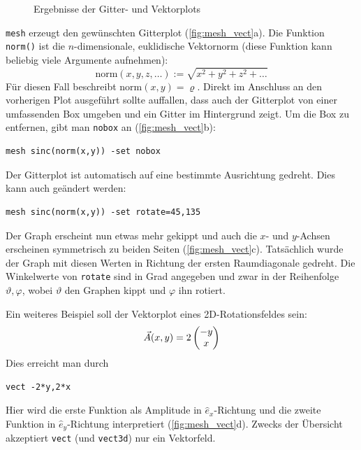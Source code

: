 \documentclass[DIV=14,headsepline,footsepline]{scrbook}
\begin{document}
\begin{figure}[p]
					\caption{Ergebnisse der Gitter- und Vektorplots}
					\label{fig:mesh_vect}
				\end{figure}
				\lstinline+mesh+ erzeugt den gewünschten Gitterplot (\autoref{fig:mesh_vect}a). Die Funktion \lstinline+norm()+ ist die $n$-di\-men\-sio\-na\-le, euklidische Vektornorm (diese Funktion kann beliebig viele Argumente aufnehmen):
				\begin{equation*}
					\text{norm}(x,y,z,\ldots) := \sqrt{x^2+y^2+z^2+\ldots}
				\end{equation*}
				Für diesen Fall beschreibt $\text{norm}(x,y) = \varrho$. Direkt im Anschluss an den vorherigen Plot ausgeführt sollte auffallen, dass auch der Gitterplot von einer umfassenden Box umgeben und ein Gitter im Hintergrund zeigt. Um die Box zu entfernen, gibt man \lstinline+nobox+ an (\autoref{fig:mesh_vect}b):
				\begin{lstlisting}
mesh sinc(norm(x,y)) -set nobox
				\end{lstlisting}
				
				Der Gitterplot ist automatisch auf eine bestimmte Ausrichtung gedreht. Dies kann auch geändert werden:
				\begin{lstlisting}
mesh sinc(norm(x,y)) -set rotate=45,135
				\end{lstlisting}
				Der Graph erscheint nun etwas mehr gekippt und auch die $x$- und $y$-Achsen erscheinen symmetrisch zu beiden Seiten (\autoref{fig:mesh_vect}c). Tatsächlich wurde der Graph mit diesen Werten in Richtung der ersten Raumdiagonale gedreht. Die Winkelwerte von \lstinline+rotate+ sind in Grad angegeben und zwar in der Reihenfolge $\vartheta,\varphi$, wobei $\vartheta$ den Graphen kippt und $\varphi$ ihn rotiert.
				
				Ein weiteres Beispiel soll der Vektorplot eines 2D-Rotationsfeldes sein:
				\[\vec A(x,y) = 2\begin{pmatrix} -y\\x \end{pmatrix}\]
				Dies erreicht man durch
				\begin{lstlisting}
vect -2*y,2*x
				\end{lstlisting}
				Hier wird die erste Funktion als Amplitude in $\hat e_x$-Richtung und die zweite Funktion in $\hat e_y$-Richtung interpretiert (\autoref{fig:mesh_vect}d). Zwecks der Übersicht akzeptiert \lstinline+vect+ (und \lstinline+vect3d+) nur ein Vektorfeld.
				
\end{document}
